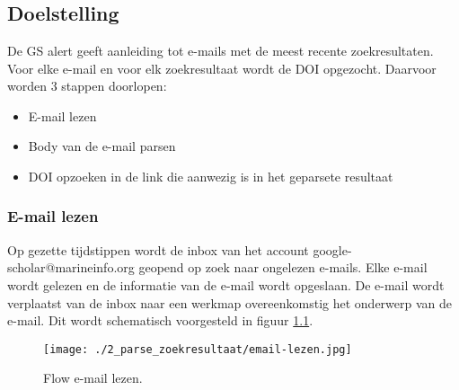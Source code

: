 
\chapter{}%
\label{ch:parsezoekresultaat}

\section{Doelstelling}
De GS alert geeft aanleiding tot e-mails met de meest recente zoekresultaten. Voor elke e-mail en voor elk zoekresultaat wordt de DOI opgezocht. Daarvoor worden 3 stappen doorlopen:
\begin{itemize}
    \item E-mail lezen
    \item Body van de e-mail parsen
    \item DOI opzoeken in de link die aanwezig is in het geparsete resultaat
\end{itemize}
\subsection{E-mail lezen}
Op gezette tijdstippen wordt de inbox van het account google-scholar@marineinfo.org geopend op zoek naar ongelezen e-mails. Elke e-mail wordt gelezen en de informatie van de e-mail wordt opgeslaan. De e-mail wordt verplaatst van de inbox naar een werkmap overeenkomstig het onderwerp van de e-mail. Dit wordt schematisch voorgesteld in figuur \ref{fig:E-mail lezen}.
\begin{figure}[h!]
    \centering
    \texttt{[image: ./2\_parse\_zoekresultaat/email-lezen.jpg]}
    \caption[E-mail lezen.]{\label{fig:E-mail lezen}Flow e-mail lezen.}
\end{figure}
